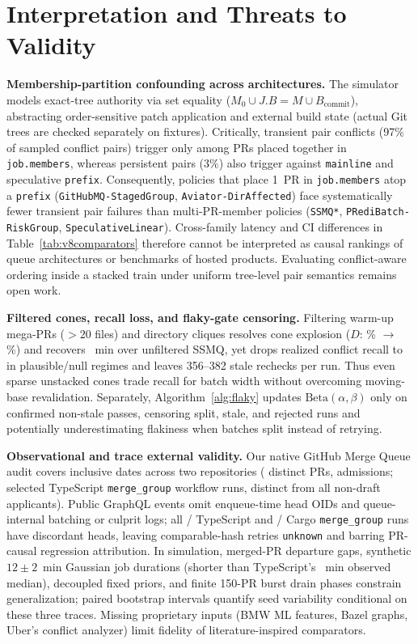 \section{Interpretation and Threats to Validity}
\label{sec:threats}
\textbf{Membership-partition confounding across architectures.} The simulator models exact-tree authority via set equality ($M_0 \cup J.B = M \cup B_{\text{commit}}$), abstracting order-sensitive patch application and external build state (actual Git trees are checked separately on fixtures). Critically, transient pair conflicts (97\% of sampled conflict pairs) trigger only among PRs placed together in \texttt{job.members}, whereas persistent pairs (3\%) also trigger against \texttt{mainline} and speculative \texttt{prefix}. Consequently, policies that place 1~PR in \texttt{job.members} atop a \texttt{prefix} (\texttt{GitHubMQ-StagedGroup}, \texttt{Aviator-DirAffected}) face systematically fewer transient pair failures than multi-PR-member policies (\texttt{SSMQ*}, \texttt{PRediBatch-RiskGroup}, \texttt{SpeculativeLinear}). Cross-family latency and CI differences in Table~\ref{tab:v8comparators} therefore cannot be interpreted as causal rankings of queue architectures or benchmarks of hosted products. Evaluating conflict-aware ordering inside a stacked train under uniform tree-level pair semantics remains open work.

\textbf{Filtered cones, recall loss, and flaky-gate censoring.} Filtering warm-up mega-PRs ($>20$ files) and directory cliques resolves cone explosion ($D$: \UnfDensity{}\% $\to$ \FcDensity{}\%) and recovers \FcNomGainVsUnf{}~min over unfiltered SSMQ, yet drops realized conflict recall to \FcNomRec{} in plausible/null regimes and leaves 356--382 stale rechecks per run. Thus even sparse unstacked cones trade recall for batch width without overcoming moving-base revalidation. Separately, Algorithm~\ref{alg:flaky} updates $\mathrm{Beta}(\alpha,\beta)$ only on confirmed non-stale passes, censoring split, stale, and rejected runs and potentially underestimating flakiness when batches split instead of retrying.

\textbf{Observational and trace external validity.} Our native GitHub Merge Queue audit covers \ObsDays{} inclusive dates across two repositories (\ObsDistinctPrs{} distinct PRs, \ObsAdmissions{} admissions; \ObsTsWfSelected{} selected TypeScript \texttt{merge\_group} workflow runs, distinct from all \ObsTsFetched{} non-draft applicants). Public GraphQL events omit enqueue-time head OIDs and queue-internal batching or culprit logs; all \ObsTsWfDiscordant{}/\ObsTsWfSelected{} TypeScript and \ObsCargoDiscordant{}/\ObsCargoDiscordant{} Cargo \texttt{merge\_group} runs have discordant heads, leaving comparable-hash retries \texttt{unknown} and barring PR-causal regression attribution. In simulation, merged-PR departure gaps, synthetic $12\pm 2$~min Gaussian job durations (shorter than TypeScript's \ObsTsWfP{}~min observed median), decoupled fixed priors, and finite 150-PR burst drain phases constrain generalization; paired bootstrap intervals quantify seed variability conditional on these three traces. Missing proprietary inputs (BMW ML features, Bazel graphs, Uber's conflict analyzer) limit fidelity of literature-inspired comparators.

